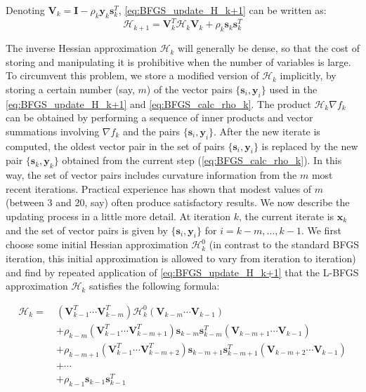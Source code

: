 Denoting $\textbf{V}_k = \textbf{I} - \rho_k\textbf{y}_k\textbf{s}_k^T$, \cref{eq:BFGS_update_H_k+1} can be written as:
\begin{equation}
  \mathcal{H}_{k+1} = \textbf{V}_k^T \mathcal{H}_{k} \textbf{V}_k +\rho_k\textbf{s}_k\textbf{s}_k^T
\end{equation}

The inverse Hessian approximation $\mathcal{H}_{k}$ will generally be dense, so that the cost of storing and manipulating it is prohibitive when the number of variables is large. To circumvent this problem, we store a modified version of $\mathcal{H}_{k}$ implicitly, by storing a certain number (say, $m$) of the vector pairs $\{\textbf{s}_i, \textbf{y}_i\}$ used in the \cref{eq:BFGS_update_H_k+1} and \cref{eq:BFGS_calc_rho_k}. The product $\mathcal{H}_{k} \nabla f_k$ can be obtained by performing a sequence of inner products and vector summations involving $\nabla f_k$ and the pairs $\{\textbf{s}_i, \textbf{y}_i\}$. After the new iterate is computed, the oldest vector pair in the set of pairs $\{\textbf{s}_i, \textbf{y}_i\}$ is replaced by the new pair $\{\textbf{s}_k, \textbf{y}_k\}$ obtained from the current step (\cref{eq:BFGS_calc_rho_k}). In this way, the set of vector pairs includes curvature information from the $m$ most recent iterations. Practical experience has shown that modest values of $m$ (between 3 and 20, say) often produce satisfactory results. We now describe the updating process in a little more detail. At iteration $k$, the current iterate is $\textbf{x}_k$ and the set of vector pairs is given by $\{\textbf{s}_i, \textbf{y}_i\}$ for $i=k-m,\ldots,k-1$. We first choose some initial Hessian approximation $\mathcal{H}_{k}^0$ (in contrast to the standard BFGS iteration, this initial approximation is allowed to vary from iteration to iteration) and find by repeated application of \cref{eq:BFGS_update_H_k+1} that the L-BFGS approximation $\mathcal{H}_{k}$ satisfies the following formula: \cite{Nocedal2006}

\begin{align}
  \mathcal{H}_{k} =\  & (\textbf{V}_{k-1}^T \cdots \textbf{V}_{k-m}^T) \mathcal{H}_{k}^0 (\textbf{V}_{k-m} \cdots \textbf{V}_{k-1})                                  \nonumber          \\
                     & + \rho_{k-m} (\textbf{V}_{k-1}^T \cdots \textbf{V}_{k-m+1}^T) \textbf{s}_{k-m} \textbf{s}_{k-m}^T (\textbf{V}_{k-m+1} \cdots \textbf{V}_{k-1}) \nonumber       \\
                     & + \rho_{k-m+1} (\textbf{V}_{k-1}^T \cdots \textbf{V}_{k-m+2}^T) \textbf{s}_{k-m+1} \textbf{s}_{k-m+1}^T (\textbf{V}_{k-m+2} \cdots \textbf{V}_{k-1}) \nonumber \\
                     & + \cdots \nonumber                                                                                                                                             \\
                     & + \rho_{k-1} \textbf{s}_{k-1} \textbf{s}_{k-1}^T
\end{align}

